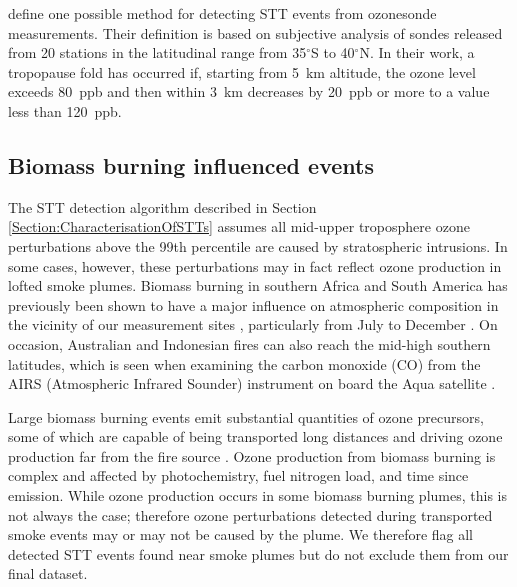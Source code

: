 \documentclass{article}
\begin{document}
    \citet{Tang2010} define one possible method for detecting STT events from ozonesonde measurements. 
    Their definition is based on subjective analysis of sondes released from 20 stations in the latitudinal range from 35$^\circ$S to 40$^\circ$N.
    In their work, a tropopause fold has occurred if, starting from 5~km altitude, the ozone level exceeds 80~ppb and then within 3~km decreases by 20~ppb or more to a value less than 120~ppb.

  \subsection{Biomass burning influenced events}
  \label{Section:BiomassBurning}
    The STT detection algorithm described in Section \ref{Section:CharacterisationOfSTTs} assumes all mid-upper troposphere ozone perturbations above the 99th percentile are caused by stratospheric intrusions. 
    In some cases, however, these perturbations may in fact reflect ozone production in lofted smoke plumes.
    Biomass burning in southern Africa and South America has previously been shown to have a major influence on atmospheric composition in the vicinity of our measurement sites \citep{Gloudemans2006, Edwards2006}, particularly from July to December \citep{Pak2003}.
    On occasion, Australian and Indonesian fires can also reach the mid-high southern latitudes, which is seen when examining the carbon monoxide (CO) from the AIRS (Atmospheric Infrared Sounder) instrument on board the Aqua satellite \citep{AIRS3STD}.
    
    Large biomass burning events emit substantial quantities of ozone precursors, some of which are capable of being transported long distances and driving ozone production far from the fire source \citep{Jaffe_2012}.
    Ozone production from biomass burning is complex and affected by photochemistry, fuel nitrogen load, and time since emission. 
    While ozone production occurs in some biomass burning plumes, this is not always the case; therefore ozone perturbations detected during transported smoke events may or may not be caused by the plume.
    We therefore flag all detected STT events found near smoke plumes but do not exclude them from our final dataset.
    
    
\end{document}
